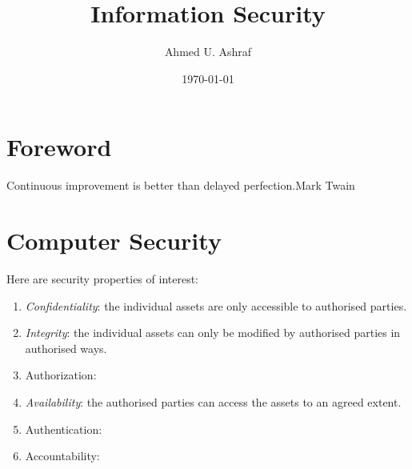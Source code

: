 \documentclass[a4paper, 12pt]{book} %
\title{Information Security}
\author{Ahmed U. Ashraf}
\date{\today }
\begin{document}
% 


\maketitle


\tableofcontents\label{toc}










\newpage


\chapter*{Foreword}
\begin{epigraph}
{Continuous improvement is better than delayed perfection.}{Mark Twain}
\end{epigraph}

\chapter{Computer Security}



Here are security properties of interest:
\begin{enumerate}
    \item \emph{Confidentiality}: the individual assets are only accessible to authorised parties.
    \item \emph{Integrity}: the individual assets can only be modified by authorised parties in authorised ways.
    \item Authorization:
    \item \emph{Availability}: the authorised parties can access the assets to an agreed extent. 
    \item Authentication:
    \item Accountability:
\end{enumerate}
\end{document}
